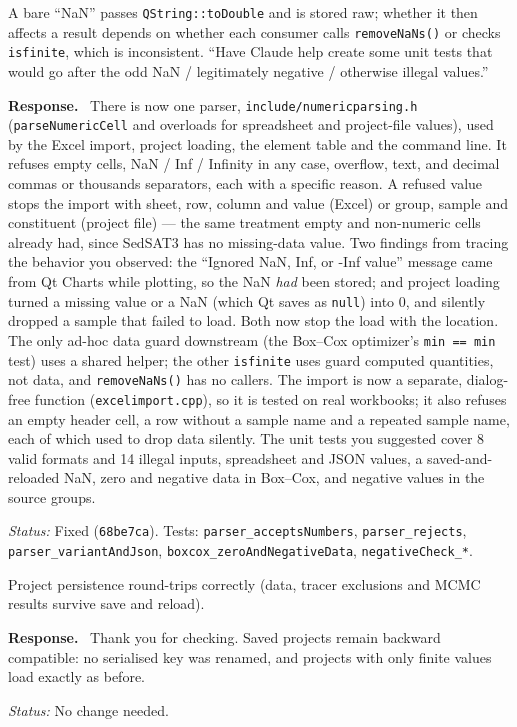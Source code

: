 \documentclass[11pt]{article}
\newcommand{\code}[1]{\texttt{#1}}
\newcommand{\commit}[1]{\texttt{#1}}
\newcounter{cmt}
\newcounter{grp}
\renewcommand{\thecmt}{\thegrp.\arabic{cmt}}
\newenvironment{reviewer}[1]{%
  \refstepcounter{cmt}%
  \begin{tcolorbox}[enhanced,breakable,colback=commentbg,colframe=usgsgreen!60,
    boxrule=0.4pt,left=6pt,right=6pt,top=4pt,bottom=4pt,
    title={\small\textbf{Comment \thecmt}\hfill\textit{#1}},
    coltitle=black,colbacktitle=usgsgreen!15,fonttitle=\small]}%
  {\end{tcolorbox}}
\newenvironment{response}{\par\noindent\textbf{Response.}\ }{\par\medskip}
\newcommand{\status}[1]{\par\noindent\textit{Status:} #1\par}
\begin{document}
\begin{reviewer}{Email 10/15, item 3; Tests, Test 4b; Email 10/16}
A bare ``NaN'' passes \code{QString::\allowbreak{}toDouble} and is stored raw; whether it
then affects a result depends on whether each consumer calls
\code{removeNaNs()} or checks \code{isfinite}, which is inconsistent.
``Have Claude help create some unit tests that would go after the odd NaN /
legitimately negative / otherwise illegal values.''
\end{reviewer}
\begin{response}
There is now one parser, \code{include/\allowbreak{}numericparsing.\allowbreak{}h}
(\code{parseNumericCell} and overloads for spreadsheet and project-file
values), used by the Excel import, project loading, the element table and
the command line. It refuses empty cells, NaN / Inf / Infinity in any case,
overflow, text, and decimal commas or thousands separators, each with a
specific reason. A refused value stops the import with sheet, row, column
and value (Excel) or group, sample and constituent (project file) — the same
treatment empty and non-numeric cells already had, since SedSAT3 has no
missing-data value. Two findings from tracing the behavior you observed:
the ``Ignored NaN, Inf, or -Inf value'' message came from Qt Charts while
plotting, so the NaN \emph{had} been stored; and project loading turned a
missing value or a NaN (which Qt saves as \code{null}) into 0, and silently
dropped a sample that failed to load. Both now stop the load with the
location. The only ad-hoc data guard downstream (the Box--Cox optimizer's
\code{min == min} test) uses a shared helper; the other \code{isfinite}
uses guard computed quantities, not data, and \code{removeNaNs()} has no
callers. The import is now a separate, dialog-free function
(\code{excelimport.cpp}), so it is tested on real workbooks; it also refuses
an empty header cell, a row without a sample name and a repeated sample name,
each of which used to drop data silently. The unit tests you suggested cover 8 valid formats and 14 illegal
inputs, spreadsheet and JSON values, a saved-and-reloaded NaN, zero and
negative data in Box--Cox, and negative values in the source groups.
\end{response}
\status{Fixed (\commit{68be7ca}). Tests: \code{parser\_\allowbreak{}acceptsNumbers}, \code{parser\_\allowbreak{}rejects},
\code{parser\_\allowbreak{}variantAndJson}, \code{boxcox\_\allowbreak{}zeroAndNegativeData}, \code{negativeCheck\_\allowbreak{}*}.}

\begin{reviewer}{Tests, Test 5}
Project persistence round-trips correctly (data, tracer exclusions and MCMC
results survive save and reload).
\end{reviewer}
\begin{response}
Thank you for checking. Saved projects remain backward compatible: no
serialised key was renamed, and projects with only finite values load
exactly as before.
\end{response}
\status{No change needed.}
\end{document}
